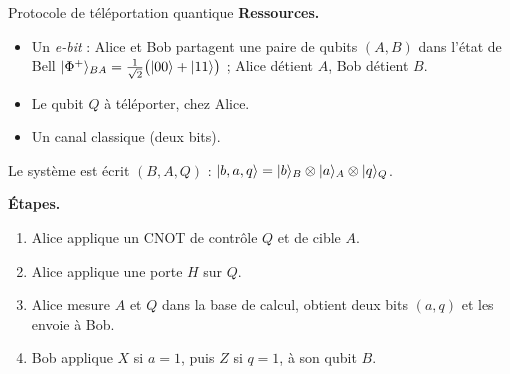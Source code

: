 \begin{definition}{Protocole de téléportation quantique}
\textbf{Ressources.}
\begin{itemize}[nosep]
  \item Un \emph{e-bit} : Alice et Bob partagent une paire de qubits $(A,B)$ dans l'état de Bell
        $|\Phi^+\rangle_{BA}=\frac{1}{\sqrt2}\big(|00\rangle+|11\rangle\big)$ ; Alice détient $A$,
        Bob détient $B$.
  \item Le qubit $Q$ à téléporter, chez Alice.
  \item Un canal classique (deux bits).
\end{itemize}
Le système est écrit $(B,A,Q)$ : $|b,a,q\rangle=|b\rangle_B\otimes|a\rangle_A\otimes|q\rangle_Q$.

\textbf{Étapes.}
\begin{enumerate}[nosep]
  \item Alice applique un CNOT de contrôle $Q$ et de cible $A$.
  \item Alice applique une porte $H$ sur $Q$.
  \item Alice mesure $A$ et $Q$ dans la base de calcul, obtient deux bits $(a,q)$ et les envoie
        à Bob.
  \item Bob applique $X$ si $a=1$, puis $Z$ si $q=1$, à son qubit $B$.
\end{enumerate}
\end{definition}

